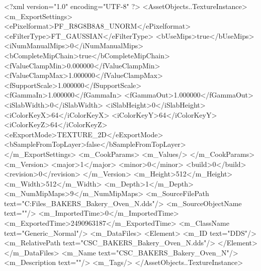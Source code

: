 <?xml version="1.0" encoding="UTF-8" ?>
<AssetObjects..TextureInstance>
	<m_ExportSettings>
		<ePixelformat>PF_R8G8B8A8_UNORM</ePixelformat>
		<eFilterType>FT_GAUSSIAN</eFilterType>
		<bUseMips>true</bUseMips>
		<iNumManualMips>0</iNumManualMips>
		<bCompleteMipChain>true</bCompleteMipChain>
		<fValueClampMin>0.000000</fValueClampMin>
		<fValueClampMax>1.000000</fValueClampMax>
		<fSupportScale>1.000000</fSupportScale>
		<fGammaIn>1.000000</fGammaIn>
		<fGammaOut>1.000000</fGammaOut>
		<iSlabWidth>0</iSlabWidth>
		<iSlabHeight>0</iSlabHeight>
		<iColorKeyX>64</iColorKeyX>
		<iColorKeyY>64</iColorKeyY>
		<iColorKeyZ>64</iColorKeyZ>
		<eExportMode>TEXTURE_2D</eExportMode>
		<bSampleFromTopLayer>false</bSampleFromTopLayer>
	</m_ExportSettings>
	<m_CookParams>
		<m_Values/>
	</m_CookParams>
	<m_Version>
		<major>1</major>
		<minor>0</minor>
		<build>0</build>
		<revision>0</revision>
	</m_Version>
	<m_Height>512</m_Height>
	<m_Width>512</m_Width>
	<m_Depth>1</m_Depth>
	<m_NumMipMaps>9</m_NumMipMaps>
	<m_SourceFilePath text="C:\Users\Shadow\Desktop\Working Files\Textures\CSC_BAKERS_Bakery_Oven_N.dds"/>
	<m_SourceObjectName text=""/>
	<m_ImportedTime>0</m_ImportedTime>
	<m_ExportedTime>2490963187</m_ExportedTime>
	<m_ClassName text="Generic_Normal"/>
	<m_DataFiles>
		<Element>
			<m_ID text="DDS"/>
			<m_RelativePath text="CSC_BAKERS_Bakery_Oven_N.dds"/>
		</Element>
	</m_DataFiles>
	<m_Name text="CSC_BAKERS_Bakery_Oven_N"/>
	<m_Description text=""/>
	<m_Tags/>
</AssetObjects..TextureInstance>


